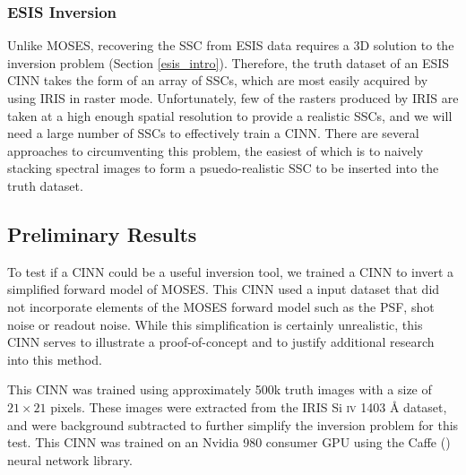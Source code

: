 \documentclass[10pt, letter]{article}
\begin{document}
			
			\subsubsection{ESIS Inversion}
			
				Unlike MOSES, recovering the SSC from ESIS data requires a 3D solution to the inversion problem (Section \ref{esis_intro}). Therefore, the truth dataset of an ESIS CINN takes the form of an array of SSCs, which are most easily acquired by using IRIS in raster mode. Unfortunately, few of the rasters produced by IRIS are taken at a high enough spatial resolution to provide a realistic SSCs, and we will need a large number of SSCs to effectively train a CINN. There are several approaches to circumventing this problem, the easiest of which is to naively stacking spectral images to form a psuedo-realistic SSC to be inserted into the truth dataset. 
		
		\subsection{Preliminary Results}
		
			To test if a CINN could be a useful inversion tool, we trained a CINN to invert a simplified forward model of MOSES. This CINN used a input dataset that did not incorporate elements of the MOSES forward model such as the PSF, shot noise or readout noise. While this simplification is certainly unrealistic, this CINN serves to illustrate a proof-of-concept and to justify additional research into this method.
			
			This CINN was trained using approximately 500k truth images with a size of $21 \times 21$ pixels. These images were extracted from the IRIS Si \textsc{iv} 1403 \AA{} dataset, and were background subtracted to further simplify the inversion problem for this test. This CINN was trained on an Nvidia 980 consumer GPU using the Caffe (\cite{jia2014caffe}) neural network library. 
			
\end{document}
